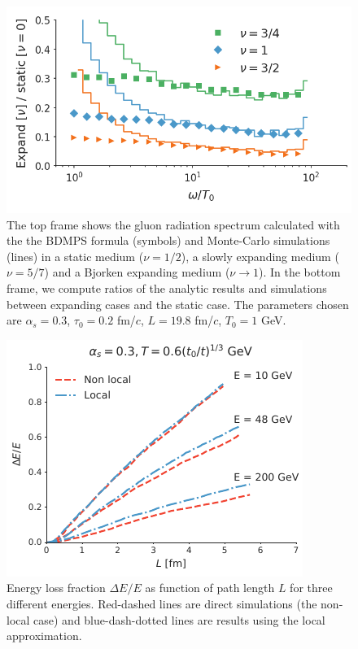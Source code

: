 \documentclass[aps, prc, reprint, amsmath, groupedaddress, nofootinbib]{revtex4-1}
\begin{document}
\begin{figure}
\includegraphics[width=\columnwidth]{spectrum_Bjorken.png}
\caption{The top frame shows the gluon radiation spectrum calculated with the the BDMPS formula (symbols) and Monte-Carlo simulations (lines) in a static medium ($\nu=1/2$), a slowly expanding medium ($\nu=5/7$) and a Bjorken expanding medium ($\nu\rightarrow 1$). In the bottom frame, we compute ratios of the analytic results and simulations between expanding cases and the static case. The parameters chosen are $\alpha_s=0.3$, $\tau_0 = 0.2$ fm/$c$, $L = 19.8$ fm/$c$, $T_0 = 1$ GeV.}
\label{fig:Bjorken-BDMPS}
\end{figure}

\begin{figure}
\includegraphics[width=\columnwidth]{Bjorken.pdf}
\caption{Energy loss fraction $\Delta E /E$ as function of path length $L$ for three different energies. Red-dashed lines are direct simulations (the non-local case) and blue-dash-dotted lines are results using the local approximation.}
\label{fig:Bjorken}
\end{figure}
\end{document}
